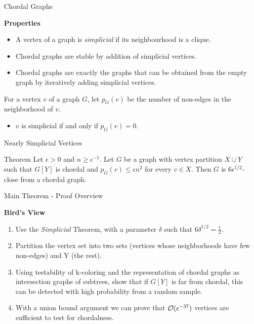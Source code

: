 \documentclass{beamer}
\begin{document}
\begin{frame}{Chordal Graphs}
	
	{\bf Properties}
	\begin{itemize}
		\item A vertex of a graph is {\it simplicial} if its neighbourhood is a clique. \pause
		\item Chordal graphs are stable by addition of simplicial vertices.
		\item Chordal graphs are exactly the graphs that can be obtained from the empty graph by iteratively adding simplicial vertices.
	\end{itemize}
\pause
\begin{exampleblock}{}
	For a vertex $v$ of a graph $G$, let $p_G(v)$ be the number of non-edges in the neighborhood of $v$. 
\end{exampleblock}
\pause
\begin{itemize}
	\item $v$ is simplicial if and only if $p_G(v) = 0$.
\end{itemize}

\end{frame}

\begin{frame}{Nearly Simplicial Vertices}
	\begin{alertblock}{Theorem}
		Let $\epsilon > 0$ and $n \ge \epsilon ^ {-1}$. Let $G$ be a graph with  vertex partition $X \cup Y$ such that $G[Y]$ is chordal and $p_G(v) \le \epsilon n^2$ for every $v \in X$. Then $G$ is $6\epsilon ^ {1/2}$-close from a chordal graph.
	\end{alertblock}
\end{frame}



\begin{frame}{Main Theorem - Proof Overview}
	
	
	{\bf Bird's View}
	
	\begin{enumerate}
		\item Use the {\em Simplicial }Theorem, with a parameter $\delta$ such that $6\delta ^{1/2} = \frac{\epsilon}{2} $.
		\item Partition the vertex set into two sets (vertices whose neighborhoods have few non-edges) and Y (the rest).
		\item Using testability of k-coloring  and the representation of chordal graphs as intersection graphs of subtrees,  show that if $G[Y]$ is far from chordal, this can be detected with high probability from a random sample. 
		
		\item With a union bound argument we can prove that ${\cal O}(\epsilon ^ {-37})$ vertices are sufficient to test for chordalness.
		
	\end{enumerate}
\end{frame}
\end{document}

